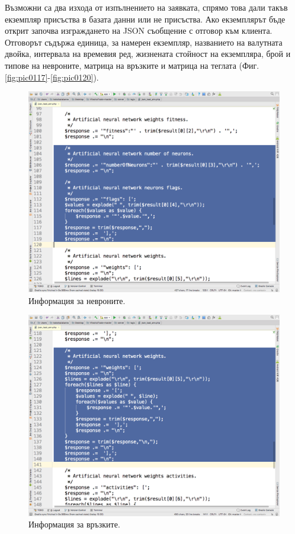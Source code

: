 \documentclass[book,14pt,oneside,openany]{memoir}
\begin{document}
Възможни са два изхода от изпълнението на заявката, спрямо това дали такъв екземпляр присъства в базата данни или не присъства. Ако екземплярът бъде открит започва изграждането на JSON съобщение с отговор към клиента. Отговорът съдържа единица, за намерен екземпляр, названието на валутната двойка, интервала на времевия ред, жизнената стойност на екземпляра, брой и типове на невроните, матрица на връзките и матрица на теглата (Фиг. \ref{fig:pic0117}-\ref{fig:pic0120}).

\begin{figure}[h]
  \centering
  \includegraphics[height=0.45\pdfpageheight]{pic0118}
  \caption{Информация за невроните.}
\label{fig:pic0118}
\end{figure}
\FloatBarrier

\begin{figure}[h]
  \centering
  \includegraphics[height=0.45\pdfpageheight]{pic0119}
  \caption{Информация за връзките.}
\label{fig:pic0119}
\end{figure}
\FloatBarrier
\end{document}
